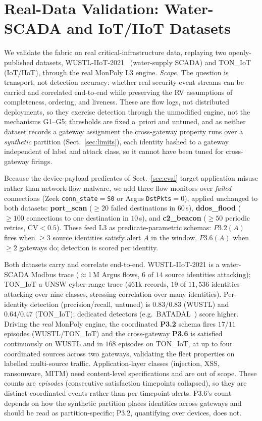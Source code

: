 \documentclass[runningheads]{llncs}
\begin{document}
\section{Real-Data Validation: Water-SCADA and IoT/IIoT Datasets}
\label{sec:casestudy}
We validate the fabric on real critical-infrastructure data, replaying two openly-published
datasets, WUSTL-IIoT-2021~\cite{wustl2021} (water-supply SCADA) and
TON\_IoT~\cite{moustafa2021toniot,alsaedi2020toniot} (IoT/IIoT), through the real MonPoly
L3 engine. \emph{Scope.} The question is transport, not detection
accuracy: whether real security-event streams can be carried and correlated end-to-end
while preserving the RV assumptions of completeness, ordering, and liveness. These are
flow logs, not distributed deployments, so they exercise detection through the unmodified
engine, not the mechanisms G1--G5; thresholds are fixed a~priori and untuned, and as
neither dataset records a gateway assignment the cross-gateway property runs over a
\emph{synthetic} partition (Sect.~\ref{sec:limits}), each identity hashed to a gateway independent of
label and attack class, so it cannot have been tuned for cross-gateway firings.

Because the device-payload predicates of Sect.~\ref{sec:eval} target application misuse
rather than network-flow malware, we add three flow monitors over \emph{failed}
connections (Zeek \texttt{conn\_state}${=}$\texttt{S0} or Argus \texttt{DstPkts}${=}0$),
applied unchanged to both datasets: \textbf{port\_scan} ($\geq20$ failed destinations in
$60$\,s), \textbf{ddos\_flood} ($\geq100$ connections to one destination in $10$\,s), and
\textbf{c2\_beacon} ($\geq50$ periodic retries, CV${<}0.5$). These feed L3 as
predicate-parametric schemas: $P3.2(A)$ fires when $\geq3$ source identities satisfy alert
$A$ in the window, $P3.6(A)$ when $\geq2$ gateways do; detection is scored per identity.

Both datasets carry and correlate end-to-end. WUSTL-IIoT-2021 is a water-SCADA Modbus
trace ($\approx$1\,M Argus flows, $6$ of $14$ source identities attacking); TON\_IoT a
UNSW cyber-range trace ($461$k records, $19$ of $11{,}536$ identities attacking over nine
classes, stressing correlation over many identities). Per-identity detection
(precision/recall, untuned) is $0.83/0.83$ (WUSTL) and $0.64/0.47$ (TON\_IoT); dedicated
detectors (e.g.\ BATADAL~\cite{taormina2018battle}) score higher. Driving the \emph{real}
MonPoly engine, the coordinated \textbf{P3.2} schema fires $17$/$11$ episodes
(WUSTL/TON\_IoT) and the cross-gateway \textbf{P3.6} is satisfied continuously on WUSTL and
in $168$ episodes on TON\_IoT, at up to four coordinated sources across two gateways,
validating the fleet properties on labelled multi-source traffic.
Application-layer classes (injection, XSS, ransomware, MITM) need content-level
specifications and are out of scope. These counts are \emph{episodes} (consecutive
satisfaction timepoints collapsed), so they are distinct coordinated events rather than
per-timepoint alerts. P3.6's count depends on how the synthetic
partition places identities across gateways and should be read as partition-specific;
P3.2, quantifying over devices, does not.
\end{document}
